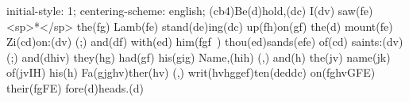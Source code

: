 initial-style: 1;
centering-scheme: english;
(cb4)Be(d)hold,(dc) I(dv) saw(fe) <sp>*</sp> the(fg) Lamb(fe) stand(de)ing(dc) up(fh)on(gf) the(d) mount(fe) Zi(cd)on:(dv) (;) and(df) with(ed) him(fgf~) thou(ed)sands(efe) of(cd) saints:(dv) (;) and(dhiv) they(hg) had(gf) his(gig) Name,(hih) (,) and(h) the(jv) name(jk) of(jvIH) his(h) Fa(gjghv)ther(hv) (,) writ(hvhggef)ten(deddc) on(fghvGFE) their(fgFE) fore(d)heads.(d)
